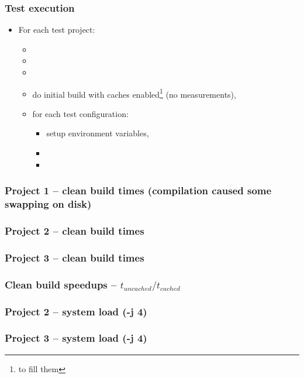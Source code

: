 \documentclass[compress,table,xcolor=table]{beamer}
\begin{document}
\begin{frame}
  \frametitle{Test execution}
    \Large
    \begin{itemize}
    \item For each test project:
    \begin{itemize}
    \item {}
    \item {}
    \item {}
    \item do initial build with caches enabled\footnote{to fill them}
        (no measurements),
    \item for each test configuration:
    \begin{itemize}
    \item setup environment variables,
    \item {}
    \item {}
    \end{itemize}
    \end{itemize}
    \end{itemize}
\end{frame}
\begin{frame}
  \frametitle{Project 1 -- clean build times {\smaller (compilation caused some swapping on disk)}}
\end{frame}
\begin{frame}
  \frametitle{Project 2 -- clean build times}
\end{frame}
\begin{frame}
  \frametitle{Project 3 -- clean build times}
\end{frame}
\begin{frame}
  \frametitle{Clean build speedups -- $t_{uncached} / t_{cached}$}
\end{frame}
\begin{frame}
  \frametitle{Project 2 -- system load (-j 4)}
\end{frame}
\begin{frame}
  \frametitle{Project 3 -- system load (-j 4)}
\end{frame}
\end{document}
